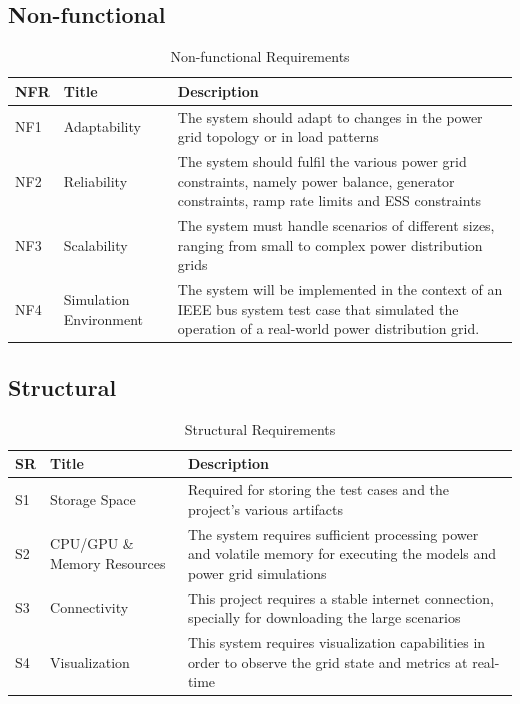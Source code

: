 \subsection{Non-functional}

\begin{table}[H]
	\centering
	\caption{Non-functional Requirements}
	\begin{tabular}{|P{1cm}|p{4cm}|p{8cm}|  }
		\hline
		\textbf{NFR} & \textbf{Title} & \textbf{Description} \\
		\hline
		NF1 & Adaptability & The system should adapt to changes in the power grid topology or in load patterns \\
		\hline
		NF2 & Reliability & The system should fulfil the various power grid constraints, namely power balance, generator constraints, ramp rate limits and \ac{ESS} constraints \\
		\hline
		NF3 & Scalability & The system must handle scenarios of different sizes, ranging from small to complex power distribution grids \\
		\hline
		NF4 & Simulation Environment & The system will be implemented in the context of an IEEE bus system test case that simulated the operation of a real-world power distribution grid. \\
		\hline
	\end{tabular}
\end{table}

\subsection{Structural}

\begin{table}[H]
	\centering
	\caption{Structural Requirements}
	\begin{tabular}{|P{2cm}|p{4cm}|p{8cm}|  }
		\hline
		\textbf{SR} & \textbf{Title} & \textbf{Description} \\
		\hline
		S1 & Storage Space & Required for storing the test cases and the project's various artifacts \\
		\hline
		S2 & CPU/GPU \& Memory Resources & The system requires sufficient processing power and volatile memory for executing the models and power grid simulations \\
		\hline
		S3 & Connectivity &  This project requires a stable internet connection, specially for downloading the large scenarios \\
		\hline
		S4 & Visualization & This system requires visualization capabilities in order to observe the grid state and metrics at real-time \\
		\hline
	\end{tabular}
\end{table}

